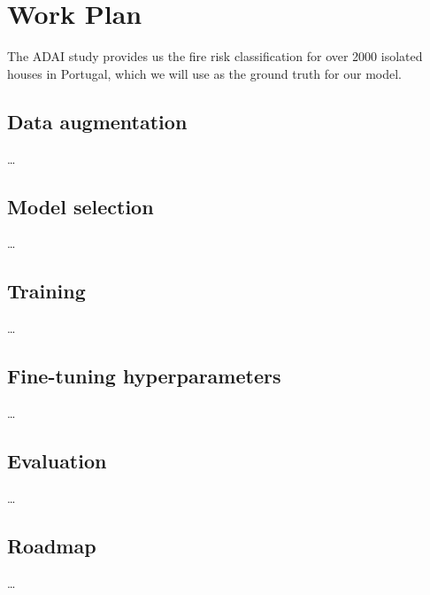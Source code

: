 
%

\chapter{Work Plan}
\label{cha:work-plan}
The ADAI study provides us the fire risk classification for over 2000 isolated houses
in Portugal, which we will use as the ground truth for our model.

\section{Data augmentation}

\dots

\section{Model selection}

\dots

\section{Training}

\dots


\section{Fine-tuning hyperparameters}

\dots

\section{Evaluation}

\dots

\section{Roadmap}

\dots
